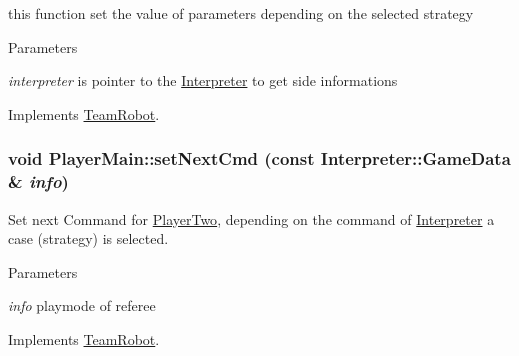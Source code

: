 this function set the value of parameters depending on the selected strategy 


\begin{DoxyParams}{Parameters}
\item[{\em interpreter}]is pointer to the \hyperlink{classInterpreter}{Interpreter} to get side informations \end{DoxyParams}


Implements \hyperlink{classTeamRobot_a34c0fd6986c510d4025e5752b3c0e49a}{TeamRobot}.

\hypertarget{classPlayerMain_a8f0320189df15529662c7f16d2f74084}{
\subsubsection[{setNextCmd}]{\setlength{\rightskip}{0pt plus 5cm}void PlayerMain::setNextCmd (const {\bf Interpreter::GameData} \& {\em info})}}
\label{classPlayerMain_a8f0320189df15529662c7f16d2f74084}


Set next Command for \hyperlink{classPlayerTwo}{PlayerTwo}, depending on the command of \hyperlink{classInterpreter}{Interpreter} a case (strategy) is selected. 


\begin{DoxyParams}{Parameters}
\item[{\em info}]playmode of referee \end{DoxyParams}


Implements \hyperlink{classTeamRobot_a65f9a2b7464dfac3f4a0336810cf574f}{TeamRobot}.



